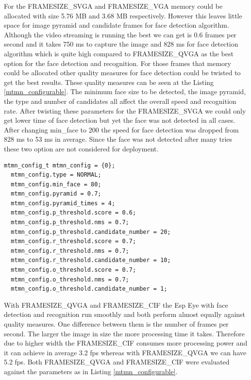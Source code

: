 For the {\selectfont FRAMESIZE\_SVGA} and {\selectfont FRAMESIZE\_VGA}  memory could be allocated with size 5.76 MB and 3.68 MB respectively. However this leaves little space for image pyramid and candidate frames for face detection algorithm. Although the video streaming is running the best we can get is 0.6 frames per second and it takes 750 ms to capture the image  and 828 ms for face detection algorithm which is quite high compared to {\selectfont FRAMESIZE\_QVGA} as the best option for the face detection and recognition. For those frames that memory could be allocated other quality measures for face detection could be twisted to get the best results. These quality measures can be seen at the Listing \ref{mtmn_configurable}. The minimum face size to be detected, the image pyramid, the type and number of candidates all affect the overall speed and recognition rate. 
After twisting these parameters for the {\selectfont FRAMESIZE\_SVGA} we could only get lower time of face detection but yet the face was not detected in all cases. After changing {\selectfont min\_face} to 200 the speed for face detection was dropped from 828 ms to 53 ms in average. Since the face was not detected after many tries these two option are not considered for deployment. 



\begin{lstlisting}[caption={Face detection configurable parameters},label=mtmn_configurable, captionpos=b]
 mtmn_config_t mtmn_config = {0};
  mtmn_config.type = NORMAL;
  mtmn_config.min_face = 80;
  mtmn_config.pyramid = 0.7; 
  mtmn_config.pyramid_times = 4;
  mtmn_config.p_threshold.score = 0.6;
  mtmn_config.p_threshold.nms = 0.7;
  mtmn_config.p_threshold.candidate_number = 20; 
  mtmn_config.r_threshold.score = 0.7;
  mtmn_config.r_threshold.nms = 0.7;
  mtmn_config.r_threshold.candidate_number = 10;
  mtmn_config.o_threshold.score = 0.7;
  mtmn_config.o_threshold.nms = 0.7;
  mtmn_config.o_threshold.candidate_number = 1;

\end{lstlisting}

With {\selectfont FRAMESIZE\_QVGA} and {\selectfont FRAMESIZE\_CIF} the Esp Eye with face detection and recognition run smoothly and both perform almost equally against quality measures. One difference between them is the number of frames per second. The larger the image in size the more processing time it takes. Therefore due to higher width the {\selectfont FRAMESIZE\_CIF} consumes more processing power and it can achieve in average 3.2 fps whereas with {\selectfont FRAMESIZE\_QVGA} we can have 5.2 fps. 
Both {\selectfont FRAMESIZE\_QVGA} and {\selectfont FRAMESIZE\_CIF} were evaluated against the parameters as in Listing \ref{mtmn_configurable}.

